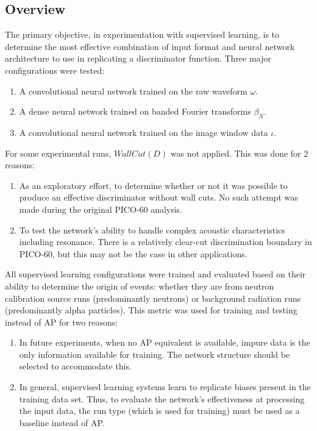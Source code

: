 \documentclass[10pt]{article}
\begin{document}
\subsection{Overview}

The primary objective, in experimentation with supervised learning, is to determine the most effective combination of input format and neural network architecture to use in replicating a discriminator function. Three major configurations were tested:

\begin{enumerate}
    \item A convolutional neural network trained on the raw waveform $\omega$.
    \item A dense neural network trained on banded Fourier transforms $\beta_{N}$.
    \item A convolutional neural network trained on the image window data $\iota$.
\end{enumerate}

For some experimental runs, $WallCut(D)$ was not applied. This was done for 2 reasons:

\begin{enumerate}
    \item As an exploratory effort, to determine whether or not it was possible to produce an effective discriminator without wall cuts. No such attempt was made during the original PICO-60 analysis.
    \item To test the network's ability to handle complex acoustic characteristics including resonance. There is a relatively clear-cut discrimination boundary in PICO-60, but this may not be the case in other applications.
\end{enumerate}

All supervised learning configurations were trained and evaluated based on their ability to determine the origin of events: whether they are from neutron calibration source runs (predominantly neutrons) or background radiation runs (predominantly alpha particles). This metric was used for training and testing instead of AP for two reasons:

\begin{enumerate}
    \item In future experiments, when no AP equivalent is available, impure data is the only information available for training. The network structure should be selected to accommodate this.
    \item In general, supervised learning systems learn to replicate biases present in the training data set. Thus, to evaluate the network's effectiveness at processing the input data, the run type (which is used for training) must be used as a baseline instead of AP.
\end{enumerate}
\end{document}
